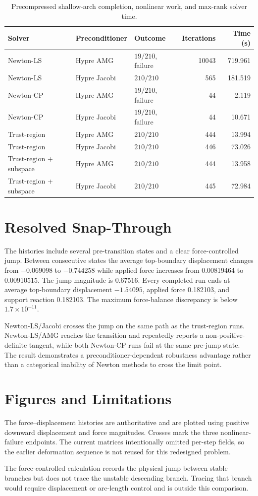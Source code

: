 \documentclass[11pt]{article}
\begin{document}
\begin{table}[h]
  \centering
  \scriptsize
  \caption{Precompressed shallow-arch completion, nonlinear work, and max-rank solver time.}
  \begin{tabular}{@{}lllrr@{}}
    \toprule
    Solver & Preconditioner & Outcome & Iterations & Time (s) \\
    \midrule
    Newton-LS & Hypre AMG & $19/210$, failure & 10043 & 719.961 \\
    Newton-LS & Hypre Jacobi & $210/210$ & 565 & 181.519 \\
    Newton-CP & Hypre AMG & $19/210$, failure & 44 & 2.119 \\
    Newton-CP & Hypre Jacobi & $19/210$, failure & 44 & 10.671 \\
    Trust-region & Hypre AMG & $210/210$ & 444 & 13.994 \\
    Trust-region & Hypre Jacobi & $210/210$ & 446 & 73.026 \\
    Trust-region + subspace & Hypre AMG & $210/210$ & 444 & 13.958 \\
    Trust-region + subspace & Hypre Jacobi & $210/210$ & 445 & 72.984 \\
    \bottomrule
  \end{tabular}
\end{table}

\section*{Resolved Snap-Through}

The histories include several pre-transition states and a clear force-controlled
jump.  Between consecutive states the average top-boundary displacement changes from
$-0.069098$ to $-0.744258$ while applied force increases from 0.00819464 to
0.00910515.  The jump magnitude is 0.67516.  Every completed run ends at average
top-boundary displacement $-1.54095$, applied force 0.182103, and support reaction 0.182103.
The maximum force-balance discrepancy is below $1.7\times10^{-11}$.

Newton-LS/Jacobi crosses the jump on the same path as the trust-region runs.
Newton-LS/AMG reaches the transition and repeatedly reports a
non-positive-definite tangent, while both Newton-CP runs fail at the same
pre-jump state.  The result demonstrates a preconditioner-dependent robustness
advantage rather than a categorical inability of Newton methods to cross the
limit point.

\section*{Figures and Limitations}

The force--displacement histories are authoritative and are plotted using
positive downward displacement and force magnitudes.  Crosses mark the three
nonlinear-failure endpoints.  The current matrices
intentionally omitted per-step fields, so the earlier deformation sequence is
not reused for this redesigned problem.

The force-controlled calculation records the physical jump between stable
branches but does not trace the unstable descending branch.  Tracing that branch
would require displacement or arc-length control and is outside this comparison.
\end{document}
